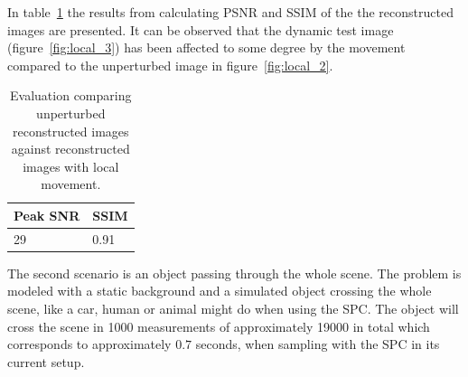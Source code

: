 In table~\ref{tab:local_dyn} the results from calculating PSNR and SSIM of the the reconstructed images are presented. It can be observed that the dynamic test image (figure~\ref{fig:local_3}) has been affected to some degree by the movement compared to the unperturbed image in figure~\ref{fig:local_2}.

\begin{table}[H]
    \centering
  \begin{tabular}{ | l | l |}
    \hline
    Peak SNR  & SSIM \\ \hline
    29  & 0.91 \\ 
    \hline
  \end{tabular}
      \caption{Evaluation comparing unperturbed reconstructed images against reconstructed images with local movement.}
    \label{tab:local_dyn}
\end{table}






The second scenario is an object passing through the whole scene. The problem is modeled with a static background and a simulated object crossing the whole scene, like a car, human or animal might do when using the SPC. The object will cross the scene in 1000 measurements of approximately 19000 in total which corresponds to approximately $0.7$ seconds, when sampling with the SPC in its current setup.\\[0.1in]



